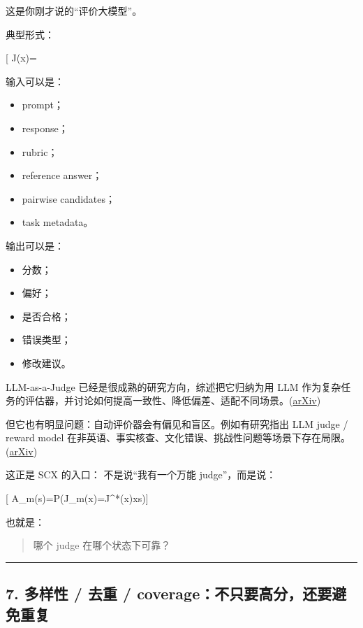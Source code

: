 \documentclass[
  12pt,
]{ctexart}
\providecommand{\tightlist}{%
  \setlength{\itemsep}{0pt}\setlength{\parskip}{0pt}}
\begin{document}
这是你刚才说的``评价大模型''。

典型形式：

{[} J(x)=\text{LLM judge score}{]}

输入可以是：

\begin{itemize}
\tightlist
\item
  prompt；
\item
  response；
\item
  rubric；
\item
  reference answer；
\item
  pairwise candidates；
\item
  task metadata。
\end{itemize}

输出可以是：

\begin{itemize}
\tightlist
\item
  分数；
\item
  偏好；
\item
  是否合格；
\item
  错误类型；
\item
  修改建议。
\end{itemize}

LLM-as-a-Judge 已经是很成熟的研究方向，综述把它归纳为用 LLM
作为复杂任务的评估器，并讨论如何提高一致性、降低偏差、适配不同场景。(\href{https://arxiv.org/abs/2411.15594?utm_source=chatgpt.com}{arXiv})

但它也有明显问题：自动评价器会有偏见和盲区。例如有研究指出 LLM judge /
reward model
在非英语、事实核查、文化错误、挑战性问题等场景下存在局限。(\href{https://arxiv.org/abs/2409.11239?utm_source=chatgpt.com}{arXiv})

这正是 SCX 的入口： 不是说``我有一个万能 judge''，而是说：

{[} A\_m(s)=P(J\_m(x)=J\^{}*(x)\mid x\in s){]}

也就是：

\begin{quote}
哪个 judge 在哪个状态下可靠？
\end{quote}

\begin{center}\rule{0.5\linewidth}{0.5pt}\end{center}

\subsection{7. 多样性 / 去重 /
coverage：不只要高分，还要避免重复}\label{ux591aux6837ux6027-ux53bbux91cd-coverageux4e0dux53eaux8981ux9ad8ux5206ux8fd8ux8981ux907fux514dux91cdux590d}
\end{document}
